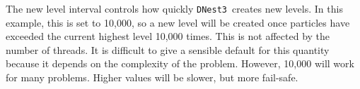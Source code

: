 \documentclass[a4paper, 11pt]{article}
\newcommand{\dnest}{{\tt DNest3}}
\begin{document}
The new level interval controls how quickly \dnest~creates new levels. In this
example, this is set to 10,000, so a new level will be created once particles
have exceeded the current highest level 10,000 times. This is not affected by
the number of threads. It is difficult to give a sensible default for this
quantity because it depends on the complexity of the problem. However, 10,000
will work for many problems. Higher values will be slower, but more fail-safe.

\end{document}
